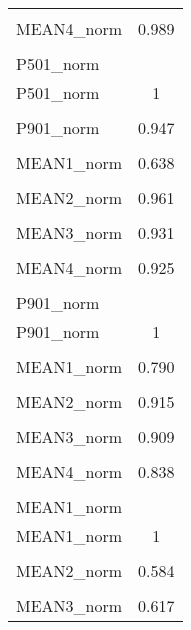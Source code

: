 {\begin{tabular}{l*{1}{c}}
            &                     \\
[1em]
MEAN4\_norm  &       0.989\sym{***}\\
            &                     \\
\hline
P501\_norm   &                     \\
P501\_norm   &           1         \\
            &                     \\
[1em]
P901\_norm   &       0.947\sym{***}\\
            &                     \\
[1em]
MEAN1\_norm  &       0.638\sym{**} \\
            &                     \\
[1em]
MEAN2\_norm  &       0.961\sym{***}\\
            &                     \\
[1em]
MEAN3\_norm  &       0.931\sym{***}\\
            &                     \\
[1em]
MEAN4\_norm  &       0.925\sym{***}\\
            &                     \\
\hline
P901\_norm   &                     \\
P901\_norm   &           1         \\
            &                     \\
[1em]
MEAN1\_norm  &       0.790\sym{***}\\
            &                     \\
[1em]
MEAN2\_norm  &       0.915\sym{***}\\
            &                     \\
[1em]
MEAN3\_norm  &       0.909\sym{***}\\
            &                     \\
[1em]
MEAN4\_norm  &       0.838\sym{***}\\
            &                     \\
\hline
MEAN1\_norm  &                     \\
MEAN1\_norm  &           1         \\
            &                     \\
[1em]
MEAN2\_norm  &       0.584\sym{*}  \\
            &                     \\
[1em]
MEAN3\_norm  &       0.617\sym{**} \\

\end{tabular}}
